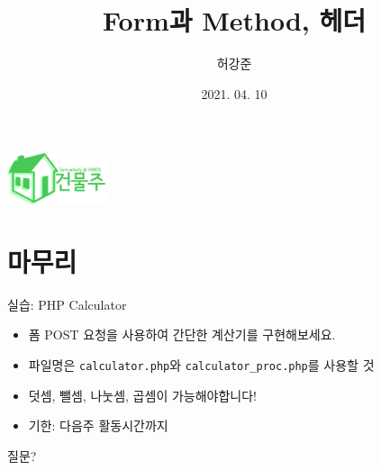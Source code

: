 \documentclass{beamer}
\title{Form과 Method, 헤더}
\author{허강준}
\institute{충남대학교 정보보호동아리 ARGOS}
\date{2021. 04. 10}
\begin{document}
\begin{frame}
    \begin{center}
        \includegraphics[height=1.5cm]{../Images/logo.png}
    \end{center}

    \maketitle
\end{frame}


\section{마무리}
    \begin{frame}{실습: PHP Calculator}
        \begin{itemize}
            \item 폼 POST 요청을 사용하여 간단한 계산기를 구현해보세요.
            \item 파일명은 \texttt{calculator.php}와 \texttt{calculator_proc.php}를 사용할 것
            \item 덧셈, 뺄셈, 나눗셈, 곱셈이 가능해야합니다!
            \item 기한: 다음주 활동시간까지
        \end{itemize}
    \end{frame}


    \begin{frame}{질문?}

    \end{frame}
\end{document}
